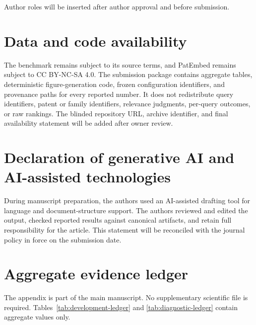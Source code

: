 \documentclass[final,5p,times,twocolumn]{elsarticle}
\begin{document}
Author roles will be inserted after author approval and before submission.

\section*{Data and code availability}

The benchmark remains subject to its source terms, and PatEmbed remains subject
to CC BY-NC-SA 4.0. The submission package contains aggregate tables,
deterministic figure-generation code, frozen configuration identifiers, and
provenance paths for every reported number. It does not redistribute query
identifiers, patent or family identifiers, relevance judgments, per-query
outcomes, or raw rankings. The blinded repository URL, archive identifier,
and final availability statement will be added after owner review.

\section*{Declaration of generative AI and AI-assisted technologies}

During manuscript preparation, the authors used an AI-assisted drafting tool
for language and document-structure support. The authors reviewed and edited
the output, checked reported results against canonical artifacts, and retain
full responsibility for the article. This statement will be reconciled with
the journal policy in force on the submission date.




\clearpage
\appendix
\ifdefined\RCRSReader\onecolumn\fi

\section{Aggregate evidence ledger}

The appendix is part of the main manuscript. No supplementary scientific file
is required. Tables~\ref{tab:development-ledger} and
\ref{tab:diagnostic-ledger} contain aggregate values only.
\end{document}
